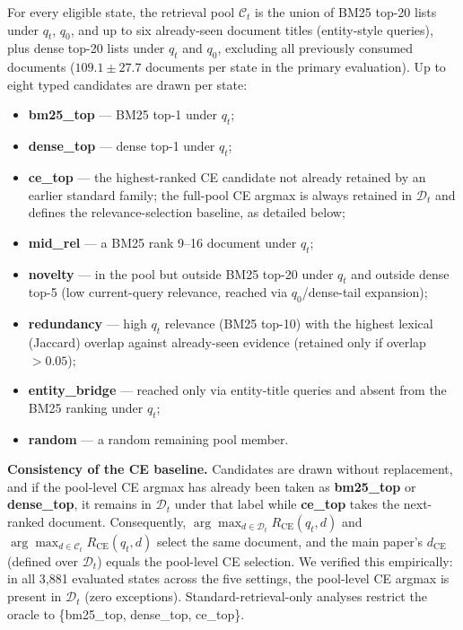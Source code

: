 \documentclass[10pt]{article}
\begin{document}
For every eligible state, the retrieval pool $\mathcal{C}_t$ is the union of
BM25 top-20 lists under $q_t$, $q_0$, and up to six already-seen document
titles (entity-style queries), plus dense top-20 lists under $q_t$ and $q_0$,
excluding all previously consumed documents
($109.1\pm27.7$ documents per state in the primary evaluation).
Up to eight typed candidates are drawn per state:

\begin{itemize}\itemsep0.15em
  \item \textbf{bm25\_top} --- BM25 top-1 under $q_t$;
  \item \textbf{dense\_top} --- dense top-1 under $q_t$;
  \item \textbf{ce\_top} --- the highest-ranked CE candidate not already
        retained by an earlier standard family; the full-pool CE argmax is
        always retained in $\mathcal{D}_t$ and defines the relevance-selection
        baseline, as detailed below;
  \item \textbf{mid\_rel} --- a BM25 rank 9--16 document under $q_t$;
  \item \textbf{novelty} --- in the pool but outside BM25 top-20 under $q_t$
        and outside dense top-5 (low current-query relevance, reached via
        $q_0$/dense-tail expansion);
  \item \textbf{redundancy} --- high $q_t$ relevance (BM25 top-10) with the
        highest lexical (Jaccard) overlap against already-seen evidence
        (retained only if overlap $>0.05$);
  \item \textbf{entity\_bridge} --- reached only via entity-title queries and
        absent from the BM25 ranking under $q_t$;
  \item \textbf{random} --- a random remaining pool member.
\end{itemize}

\noindent
\textbf{Consistency of the CE baseline.}
Candidates are drawn without replacement, and if the pool-level CE argmax has
already been taken as \textbf{bm25\_top} or \textbf{dense\_top}, it remains in
$\mathcal{D}_t$ under that label while \textbf{ce\_top} takes the next-ranked
document.
Consequently, $\arg\max_{d\in\mathcal{D}_t} R_{\mathrm{CE}}(q_t,d)$ and
$\arg\max_{d\in\mathcal{C}_t} R_{\mathrm{CE}}(q_t,d)$ select the same document,
and the main paper's $d_{\mathrm{CE}}$ (defined over $\mathcal{D}_t$) equals
the pool-level CE selection.
We verified this empirically: in all 3{,}881 evaluated states across the five
settings, the pool-level CE argmax is present in $\mathcal{D}_t$
(zero exceptions).
Standard-retrieval-only analyses restrict the oracle to
\{bm25\_top, dense\_top, ce\_top\}.
\end{document}
